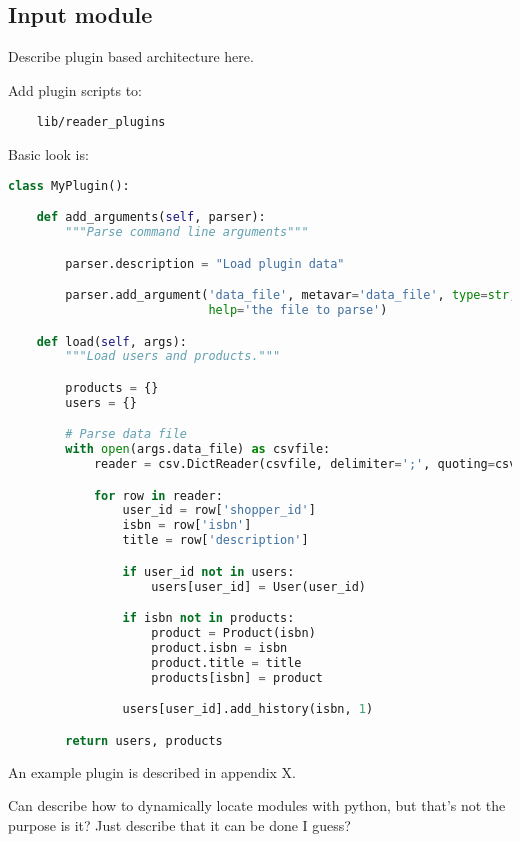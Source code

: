 
\subsection{Input module}\label{sec:res:input}

Describe plugin based architecture here.

Add plugin scripts to:


\begin{lstlisting}
    lib/reader_plugins
\end{lstlisting}

Basic look is:

\begin{lstlisting}[language=python]
class MyPlugin():

    def add_arguments(self, parser):
        """Parse command line arguments"""

        parser.description = "Load plugin data"

        parser.add_argument('data_file', metavar='data_file', type=str,
                            help='the file to parse')

    def load(self, args):
        """Load users and products."""

        products = {}
        users = {}

        # Parse data file
        with open(args.data_file) as csvfile:
            reader = csv.DictReader(csvfile, delimiter=';', quoting=csv.QUOTE_NONE)

            for row in reader:
                user_id = row['shopper_id']
                isbn = row['isbn']
                title = row['description']

                if user_id not in users:
                    users[user_id] = User(user_id)

                if isbn not in products:
                    product = Product(isbn)
                    product.isbn = isbn
                    product.title = title
                    products[isbn] = product

                users[user_id].add_history(isbn, 1)

        return users, products
\end{lstlisting}

An example plugin is described in appendix X. 

Can describe how to dynamically locate modules with python, but that's not the purpose is it? Just describe that it can be done I guess?


